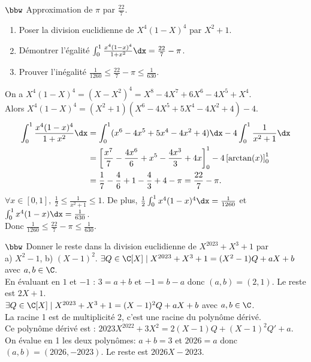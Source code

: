 \documentclass[11pt]{article}
\begin{document}
\begin{exercice}{$\bbw$ Approximation de $\pi$ par $\frac{22}{7}$.}{}
    \begin{enumerate}
        \item Poser la division euclidienne de $X^4(1-X)^4$ par $X^2+1$.
        \item Démontrer l'égalité $\int_0^1\frac{x^4(1-x)^4}{1+x^2}\dx=\frac{22}{7}-\pi$.
        \item Prouver l'inégalité $\frac{1}{1260}\leq\frac{22}{7}-\pi\leq\frac{1}{630}$.
    \end{enumerate}
    \tcblower
     On a $X^4(1-X)^4=(X-X^2)^4=X^8-4X^7+6X^6-4X^5+X^4$.\\
    Alors $X^4(1-X)^4=(X^2+1)(X^6-4X^5+5X^4-4X^2+4)-4$.\\
    \begin{align*}
        \int_0^1\frac{x^4(1-x)^4}{1+x^2}\dx&=\int_0^1(x^6-4x^5+5x^4-4x^2+4)\dx-4\int_0^1\frac{1}{x^2+1}\dx\\
        &=\left[ \frac{x^7}{7} - \frac{4x^6}{6} + x^5 - \frac{4x^3}{3} + 4x \right]_0^1 - 4\left[ \arctan(x) \right]_0^1\\
        &=\frac{1}{7}-\frac{4}{6}+1-\frac{4}{3}+4-\pi = \frac{22}{7}-\pi.
    \end{align*}
     $\forall x \in [0,1], ~ \frac{1}{2}\leq\frac{1}{x^2+1}\leq1$. De plus, $\frac{1}{2}\int_0^1x^4(1-x)^4\dx=\frac{1}{1260}$ et $\int_0^1x^4(1-x)\dx=\frac{1}{630}$.\\
    Donc $\frac{1}{1260}\leq\frac{22}{7}-\pi\leq\frac{1}{630}$.
\end{exercice}

\begin{exercice}{$\bbw$}{}
    Donner le reste dans la division euclidienne de $X^{2023}+X^3+1$ par\\
    a) $X^2-1$, \quad b) $(X-1)^2$.
    \tcblower
     $\exists Q\in\C[X] \mid X^{2023}+X^3+1=(X^2-1)Q+aX+b$ avec $a,b\in\C$.\\
    En évaluant en $1$ et $-1$ : $3 = a+b$ et $-1=b-a$ donc $(a,b)=(2,1)$. Le reste est $2X+1$.\\
     $\exists Q \in \C[X] \mid X^{2023}+X^3+1=(X-1)^2Q+aX+b$ avec $a,b\in\C$.\\
    La racine 1 est de multiplicité 2, c'est une racine du polynôme dérivé.\\
    Ce polynôme dérivé est : $2023X^{2022}+3X^2=2(X-1)Q+(X-1)^2Q'+a$.\\
    On évalue en 1 les deux polynômes: $a+b=3$ et $2026=a$ donc $(a,b)=(2026,-2023)$. Le reste est $2026X-2023$.
\end{exercice}
\end{document}
